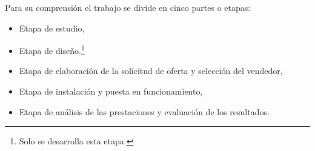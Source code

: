 

Para su comprensión el trabajo se divide en cinco partes o etapas:
\begin{itemize}
\item Etapa de estudio,
\item Etapa de diseño.\footnote{Solo se desarrolla esta etapa.}
\item Etapa de elaboración de la solicitud de oferta y selección del vendedor,
\item Etapa de instalación y puesta en funcionamiento,
\item Etapa de análisis de las prestaciones y evaluación de los resultados.
\end{itemize}
 

